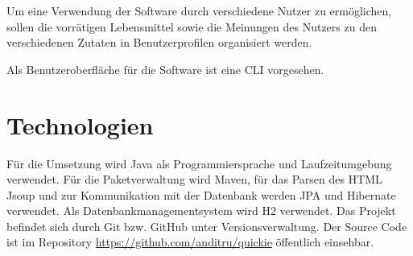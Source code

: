 Um eine Verwendung der Software durch verschiedene Nutzer zu ermöglichen, sollen die vorrätigen Lebensmittel sowie die Meinungen des Nutzers zu den verschiedenen Zutaten in Benutzerprofilen organisiert werden.

Als Benutzeroberfläche für die Software ist eine \ac{CLI} vorgesehen.

\section{Technologien}
Für die Umsetzung wird Java als Programmiersprache und Laufzeitumgebung verwendet. Für die Paketverwaltung wird Maven, für das Parsen des HTML Jsoup und zur Kommunikation mit der Datenbank werden JPA und Hibernate verwendet. Als Datenbankmanagementsystem wird H2 verwendet. Das Projekt befindet sich durch Git bzw. GitHub unter Versionsverwaltung. Der Source Code ist im Repository \href{https://youtu.be/dQw4w9WgXcQ}{https://github.com/anditru/quickie} öffentlich einsehbar.
